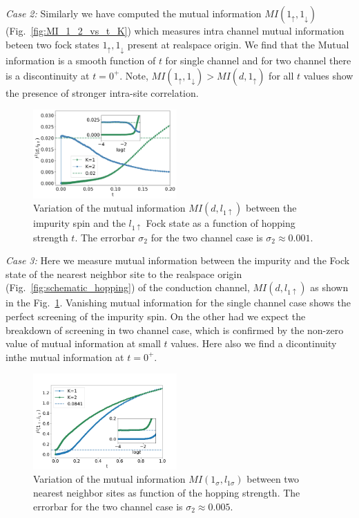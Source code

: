 \documentclass[reprint,prb,superscriptaddress]{revtex4-2}
\begin{document}
\par\textit{Case 2:} Similarly we have computed the mutual information $MI(1_{\uparrow},1_{\downarrow})$ (Fig.~\ref{fig:MI_1_2_vs_t_K}) which measures intra channel  mutual information beteen two fock states $1_{\uparrow},1_{\downarrow}$ present at realspace origin. We find that the Mutual information is a smooth function of $t$ for single channel and for two channel there is a discontinuity at $t=0^{+}$. Note, $MI(1_{\uparrow},1_{\downarrow})>MI(d,1_{\uparrow})$ for all $t$ values show the presence of stronger intra-site correlation.
\begin{figure}
\includegraphics[width=0.49\textwidth]{plt/A_I2_ch12_['d','l1_up']}
\caption{Variation of the mutual information $MI(d,l_{1\uparrow})$ between the impurity spin and the $l_{1\uparrow}$ Fock state as a function of hopping strength $t$. The errorbar $\sigma_2$ for the two channel case is $\sigma_2\approx 0.001$.}
\label{fig:MI_d_l1}
\end{figure}
\par \textit{Case 3:} Here we measure mutual information between the impurity and the Fock state of the nearest neighbor site to the realspace origin (Fig.~\ref{fig:schematic_hopping}) of the conduction channel, $MI(d,l_{1\uparrow})$ as shown in the Fig.~\ref{fig:MI_d_l1}. Vanishing mutual information for the single channel case shows the perfect screening of the impurity spin. On the other had we expect the breakdown of screening in two channel case, which is confirmed by the non-zero value of mutual information at small $t$ values. Here also we find a dicontinuity inthe mutual information at $t=0^+$.
\begin{figure}[!htpb]
\includegraphics[width=0.49\textwidth]{plt/A_I2_ch12_['1','l1']}
\caption{Variation of the mutual information $MI(1_{\sigma},l_{1\sigma})$ between two nearest neighbor sites as function of the hopping strength. The errorbar for the two channel case is $\sigma_2\approx 0.005$.}
\label{fig:MI_l_l1}
\end{figure}
\end{document}
